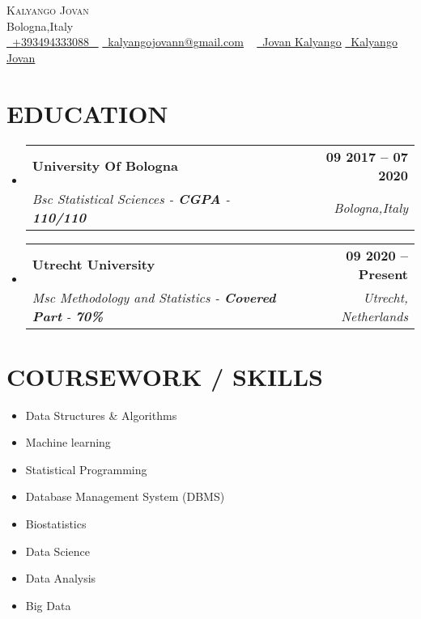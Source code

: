 \documentclass[letterpaper,11pt]{article}
\makeatletter
\newcommand{\resumeSubheading}[4]{
  \vspace{-2pt}\item
    \begin{tabular*}{1.0\textwidth}[t]{l@{\extracolsep{\fill}}r}
      \textbf{\large#1} & \textbf{\small #2} \\
      \textit{\large#3} & \textit{\small #4} \\
      
    \end{tabular*}\vspace{-7pt}
}
\newcommand{\resumeSubHeadingListStart}{\begin{itemize}[leftmargin=0.0in, label={}]}
\newcommand{\resumeSubHeadingListEnd}{\end{itemize}}
\makeatother
\begin{document}


\begin{center}
    {\Huge \scshape Kalyango Jovan} \\ \vspace{3pt}
    Bologna,Italy \\ \vspace{1pt}
    \small \href{tel:+xxxxxxxxxxxx}{ \raisebox{-0.1\height}\faPhone\ \underline{+393494333088} ~} \href{mailto:kalyangojovann@gmail.com}{\raisebox{-0.2\height}\faEnvelope\  \underline{kalyangojovann@gmail.com}} ~ 
    \href{https://www.linkedin.com/in/jovan-kalyango-bba725131/}{\raisebox{-0.2\height}\faLinkedinSquare\ \underline{Jovan Kalyango}} 
    \href{https://github.com/KalyangoJovan}{\raisebox{-0.2\height}\faGithub\ \underline{Kalyango Jovan}} ~
    \vspace{8pt}
\end{center}


\section{EDUCATION}
  \resumeSubHeadingListStart
    \resumeSubheading
      {University Of Bologna}{09 2017 -- 07 2020}
      { Bsc Statistical Sciences - \textbf{CGPA} - \textbf{110/110}}{Bologna,Italy}
  \resumeSubHeadingListEnd
  
  \resumeSubHeadingListStart
    \resumeSubheading
      {Utrecht University}{09 2020 -- Present}
      {Msc Methodology and Statistics  - \textbf{Covered Part} - \textbf{70\%}}{Utrecht, Netherlands}
  \resumeSubHeadingListEnd

\section{COURSEWORK / SKILLS}
        \begin{multicols}{4}
            \begin{itemize}[itemsep=2pt, parsep=5pt]
                \item Data Structures \& Algorithms
                \item Machine learning 
                \item Statistical Programming
                \item Database Management System (DBMS)
                \item Biostatistics
                \item Data Science
                \item Data Analysis
                \item Big Data
            \end{itemize}
        \end{multicols}
        \vspace*{2.0\multicolsep}
\end{document}
